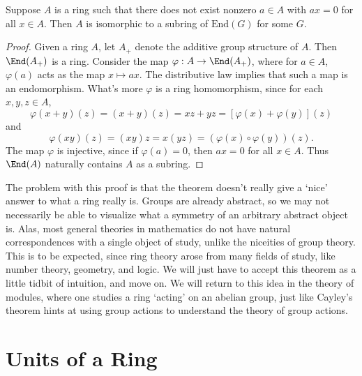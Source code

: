 \begin{theorem}
    Suppose $A$ is a ring such that there does not exist nonzero $a \in A$ with $ax = 0$ for all $x \in A$. Then $A$ is isomorphic to a subring of $\text{End}(G)$ for some $G$.
\end{theorem}
\begin{proof}
    Given a ring $A$, let $A_+$ denote the additive group structure of $A$. Then $\End(A_+)$ is a ring. Consider the map $\varphi: A \to \End(A_+)$, where for $a \in A$, $\varphi(a)$ acts as the map $x \mapsto ax$. The distributive law implies that such a map is an endomorphism. What's more $\varphi$ is a ring homomorphism, since for each $x,y,z \in A$,
    \[ \varphi(x + y)(z) = (x + y)(z) = xz + yz = [\varphi(x) + \varphi(y)](z) \]
    and
    \[ \varphi(xy)(z) = (xy)z = x(yz) = (\varphi(x) \circ \varphi(y))(z). \]
    The map $\varphi$ is injective, since if $\varphi(a) = 0$, then $ax = 0$ for all $x \in A$. Thus $\End(A)$ naturally contains $A$ as a subring.
\end{proof}

The problem with this proof is that the theorem doesn't really give a `nice' answer to what a ring really is. Groups are already abstract, so we may not necessarily be able to visualize what a symmetry of an arbitrary abstract object is. Alas, most general theories in mathematics do not have natural correspondences with a single object of study, unlike the niceities of group theory. This is to be expected, since ring theory arose from many fields of study, like number theory, geometry, and logic. We will just have to accept this theorem as a little tidbit of intuition, and move on. We will return to this idea in the theory of modules, where one studies a ring `acting' on an abelian group, just like Cayley's theorem hints at using group actions to understand the theory of group actions.

\section{Units of a Ring}

